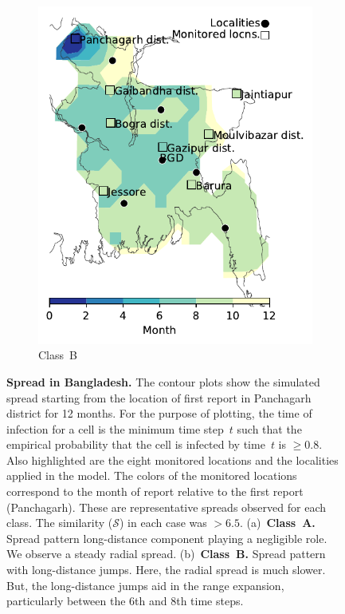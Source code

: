 \documentclass[11pt]{article}
\newcommand{\similarity}{\mathcal{S}}
\theoremstyle{definition}
\begin{document}
\begin{figure}[!ht]
\begin{subfigure}[b]{.47\textwidth}
    \includegraphics[width=\textwidth]{../cellular_automata/results/contour/BGD_model-B_m1_l3.pdf}
    \caption{Class~B\label{fig:bgdClassB1}}
\end{subfigure}
\caption{\textbf{Spread in Bangladesh.} The contour plots show the
simulated spread starting from the location of first report in Panchagarh
district for 12 months. For the purpose of plotting, the time of infection
for a cell is the minimum time step~$t$ such that the empirical probability
that the cell is infected by time~$t$ is $\ge0.8$. Also highlighted are the
eight monitored locations and the localities applied in the model. The
colors of the monitored locations correspond to the month of report
relative to the first report (Panchagarh). These are representative spreads
observed for each class. The similarity ($\similarity$) in each case was $>6.5$.
(a)~\textbf{Class~A.} Spread pattern long-distance component playing a
negligible role. We
observe a steady radial spread.  (b)~\textbf{Class~B.} Spread pattern with
long-distance jumps. Here, the radial spread is much slower. But, the
long-distance jumps aid in the range expansion, particularly between the
6th and 8th time steps.}
\end{figure}
\end{document}
